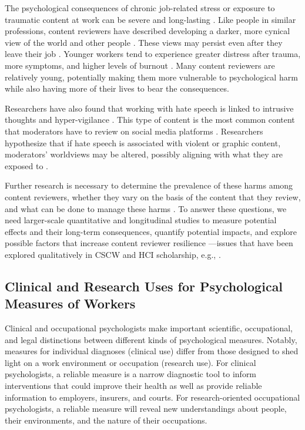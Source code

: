 The psychological consequences of chronic job-related stress or exposure to traumatic content at work can be severe and long-lasting \cite{vasconcelos2021,spence_psychological_2023}. Like people in similar professions, content reviewers have described developing a darker, more cynical view of the world and other people \cite{omalley2019,spence_psychological_2023}. These views may persist even after they leave their job \cite{omalley2019, spence_psychological_2023}. Younger workers tend to experience greater distress after trauma, more symptoms, and higher levels of burnout \cite{acierno2006,adams2006,brady2017,spence_psychological_2023}. Many content reviewers are relatively young, potentially making them more vulnerable to psychological harm while also having more of their lives to bear the consequences.

Researchers have also found that working with hate speech is linked to intrusive thoughts and hyper-vigilance \cite{jereza2022,spence_psychological_2023}. This type of content is the most common content that moderators have to review on social media platforms \cite{facebook2022a,twitter2021,spence_psychological_2023}. Researchers hypothesize that if hate speech is associated with violent or graphic content, moderators' worldviews may be altered, possibly aligning with what they are exposed to \cite{jereza2022,spence_psychological_2023}.

Further research is necessary to determine the prevalence of these harms among content reviewers, whether they vary on the basis of the content that they review, and what can be done to manage these harms \cite{jereza2022,spence_psychological_2023}. To answer these questions, we need larger-scale quantitative and longitudinal studies to measure potential effects and their long-term consequences, quantify potential impacts, and explore possible factors that increase content reviewer resilience \cite{burns2008,samsha2014,spence_psychological_2023}—issues that have been explored qualitatively in CSCW and HCI scholarship, e.g., \cite{dosono2019,finholt_psychology_1998,fox_patchwork_2023,cook_awe_2022}.

\subsection{Clinical and Research Uses for Psychological Measures of Workers}
Clinical and occupational psychologists make important scientific, occupational, and legal distinctions between different kinds of psychological measures. Notably, measures for individual diagnoses (clinical use) differ from those designed to shed light on a work environment or occupation (research use). For clinical psychologists, a reliable measure is a narrow diagnostic tool to inform interventions that could improve their health as well as provide reliable information to employers, insurers, and courts. For research-oriented occupational psychologists, a reliable measure will reveal new understandings about people, their environments, and the nature of their occupations.

